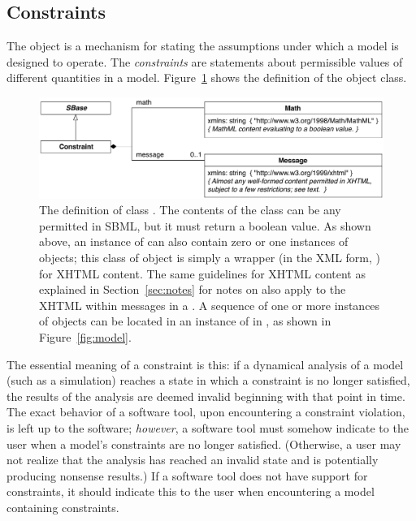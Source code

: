 \subsection{Constraints}
\label{sec:constraints}

The \Constraint object is a mechanism for stating the
assumptions under which a model is designed to operate.  The
\emph{constraints} are statements about permissible values of
different quantities in a model.  Figure~\ref{fig:constraint}
shows the definition of the \Constraint object class.

\begin{figure}[htb]
  \centering
  \small
  \vspace*{2ex}
  \includegraphics[scale=0.8]{figs/constraint-uml}
  \caption{The definition of class \Constraint.  The contents of
    the  class can be any \mathml permitted in SBML,
    but it must return a boolean value.  As shown above, an
    instance of \Constraint can also contain zero or one instances
    of \Message objects; this class of object is simply a wrapper
    (in the XML form, ) for
    XHTML content.  The same guidelines for XHTML content as
    explained in Section~\ref{sec:notes} for notes on \SBase also
    apply to the XHTML within messages in a \Constraint. A
    sequence of one or more instances of \Constraint objects can
    be located in an instance of \ListOfConstraints in \Model, as
    shown in Figure~\protect\ref{fig:model}.}
  \label{fig:constraint}
\end{figure}

The essential meaning of a constraint is this: if a dynamical
analysis of a model (such as a simulation) reaches a state in
which a constraint is no longer satisfied, the results of the
analysis are deemed invalid beginning with that point in time.
The exact behavior of a software tool, upon encountering a
constraint violation, is left up to the software; \emph{however},
a software tool must somehow indicate to the user when a model's
constraints are no longer satisfied.  (Otherwise, a user may not
realize that the analysis has reached an invalid state and is
potentially producing nonsense results.)  If a software tool does
not have support for constraints, it should indicate this to the
user when encountering a model containing constraints.


